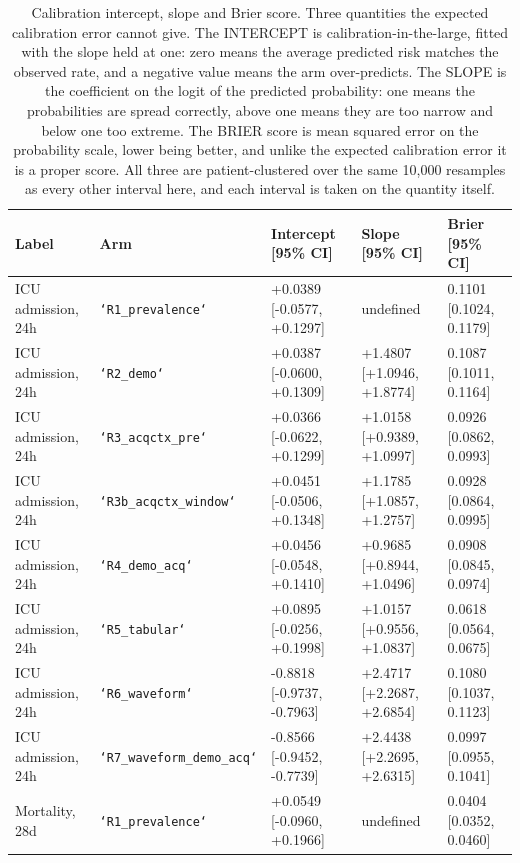 \begin{table}[t]
\centering
\small
\caption{Calibration intercept, slope and Brier score. Three quantities the expected calibration error cannot give. The INTERCEPT is calibration-in-the-large, fitted with the slope held at one: zero means the average predicted risk matches the observed rate, and a negative value means the arm over-predicts. The SLOPE is the coefficient on the logit of the predicted probability: one means the probabilities are spread correctly, above one means they are too narrow and below one too extreme. The BRIER score is mean squared error on the probability scale, lower being better, and unlike the expected calibration error it is a proper score. All three are patient-clustered over the same 10,000 resamples as every other interval here, and each interval is taken on the quantity itself.}
\label{tab:calfit}
\begin{tabular}{lllll}
\toprule
Label & Arm & Intercept [95\% CI] & Slope [95\% CI] & Brier [95\% CI] \\
\midrule
ICU admission, 24h & \texttt{`R1\_prevalence`} & +0.0389 [-0.0577, +0.1297] & undefined & 0.1101 [0.1024, 0.1179] \\
ICU admission, 24h & \texttt{`R2\_demo`} & +0.0387 [-0.0600, +0.1309] & +1.4807 [+1.0946, +1.8774] & 0.1087 [0.1011, 0.1164] \\
ICU admission, 24h & \texttt{`R3\_acqctx\_pre`} & +0.0366 [-0.0622, +0.1299] & +1.0158 [+0.9389, +1.0997] & 0.0926 [0.0862, 0.0993] \\
ICU admission, 24h & \texttt{`R3b\_acqctx\_window`} & +0.0451 [-0.0506, +0.1348] & +1.1785 [+1.0857, +1.2757] & 0.0928 [0.0864, 0.0995] \\
ICU admission, 24h & \texttt{`R4\_demo\_acq`} & +0.0456 [-0.0548, +0.1410] & +0.9685 [+0.8944, +1.0496] & 0.0908 [0.0845, 0.0974] \\
ICU admission, 24h & \texttt{`R5\_tabular`} & +0.0895 [-0.0256, +0.1998] & +1.0157 [+0.9556, +1.0837] & 0.0618 [0.0564, 0.0675] \\
ICU admission, 24h & \texttt{`R6\_waveform`} & -0.8818 [-0.9737, -0.7963] & +2.4717 [+2.2687, +2.6854] & 0.1080 [0.1037, 0.1123] \\
ICU admission, 24h & \texttt{`R7\_waveform\_demo\_acq`} & -0.8566 [-0.9452, -0.7739] & +2.4438 [+2.2695, +2.6315] & 0.0997 [0.0955, 0.1041] \\
Mortality, 28d & \texttt{`R1\_prevalence`} & +0.0549 [-0.0960, +0.1966] & undefined & 0.0404 [0.0352, 0.0460] \\

\end{tabular}
\end{table}
